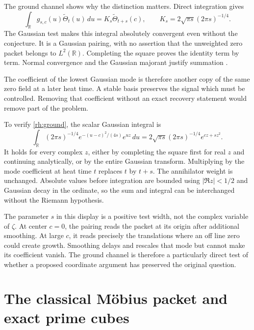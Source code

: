 
The ground channel shows why the distinction matters. Direct integration gives
\begin{equation}\label{rh:ground}
\int_{\mathbb R}g_{s,c}(u)\widetilde\Theta_t(u)\,du
=K_s\widetilde\Theta_{t+s}(c),
\qquad K_s=2\sqrt{\pi s}(2\pi s)^{-1/4}.
\end{equation}
The Gaussian test makes this integral absolutely convergent even without the conjecture. It is a Gaussian pairing, with no assertion that the unweighted zero packet belongs to \(L^2(\mathbb R)\). Completing the square proves the identity term by term. Normal convergence and the Gaussian majorant justify summation \cite{KomorebiGround}.

The coefficient of the lowest Gaussian mode is therefore another copy of the same zero field at a later heat time. A stable basis preserves the signal which must be controlled. Removing that coefficient without an exact recovery statement would remove part of the problem.

To verify \eqref{rh:ground}, the scalar Gaussian integral is
\[
\int_{\mathbb R}(2\pi s)^{-1/4}
e^{-(u-c)^2/(4s)}e^{uz}\,du
=2\sqrt{\pi s}(2\pi s)^{-1/4}e^{cz+sz^2}.
\]
It holds for every complex \(z\), either by completing the square first for real \(z\) and continuing analytically, or by the entire Gaussian transform. Multiplying by the mode coefficient at heat time \(t\) replaces \(t\) by \(t+s\). The annihilator weight is unchanged. Absolute values before integration are bounded using \(|\Re z|<1/2\) and Gaussian decay in the ordinate, so the sum and integral can be interchanged without the Riemann hypothesis.

The parameter \(s\) in this display is a positive test width, not the complex variable of \(\zeta\). At center \(c=0\), the pairing reads the packet at its origin after additional smoothing. At large \(c\), it reads precisely the translations where an off line zero could create growth. Smoothing delays and rescales that mode but cannot make its coefficient vanish. The ground channel is therefore a particularly direct test of whether a proposed coordinate argument has preserved the original question.

\section{The classical Möbius packet and exact prime cubes}

